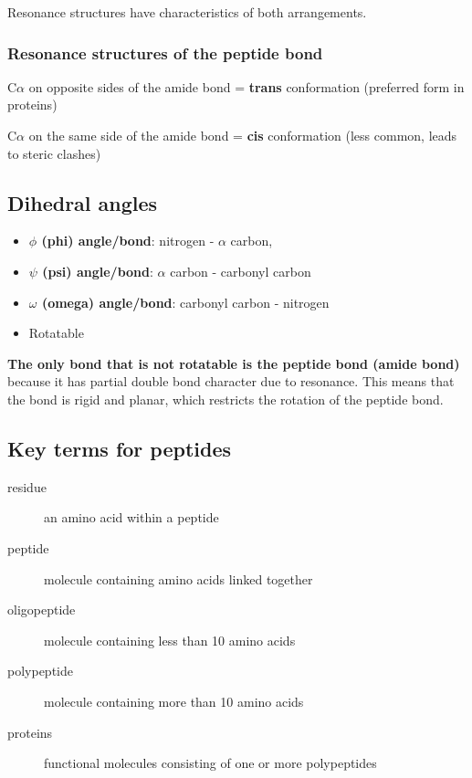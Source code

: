 \documentclass[letterpaper, 12pt]{article}
\begin{document}
Resonance structures have characteristics of both arrangements.

\subsubsection*{Resonance structures of the peptide bond}

C$\alpha$ on opposite sides of the amide bond = \textbf{trans} conformation (preferred form in proteins)

C$\alpha$ on the same side of the amide bond = \textbf{cis} conformation (less common, leads to steric clashes)

\subsection*{Dihedral angles}

\begin{itemize}
\item \textbf{$\phi$ (phi) angle/bond}: nitrogen - $\alpha$ carbon, 
\item \textbf{$\psi$ (psi) angle/bond}: $\alpha$ carbon - carbonyl carbon 
\item \textbf{$\omega$ (omega) angle/bond}: carbonyl carbon - nitrogen 
\item Rotatable
\end{itemize}

\textbf{The only bond that is not rotatable is the peptide bond (amide bond)} because it has partial double bond character due to resonance. This means that the  bond is rigid and planar, which restricts the rotation of the peptide bond.

\subsection*{Key terms for peptides}

\begin{description}
\item [residue] an amino acid within a peptide
\item [peptide] molecule containing amino acids linked together
\item [oligopeptide] molecule containing less than 10 amino acids
\item [polypeptide] molecule containing more than 10 amino acids
\item [proteins] functional molecules consisting of one or more polypeptides
\end{description}
\end{document}
